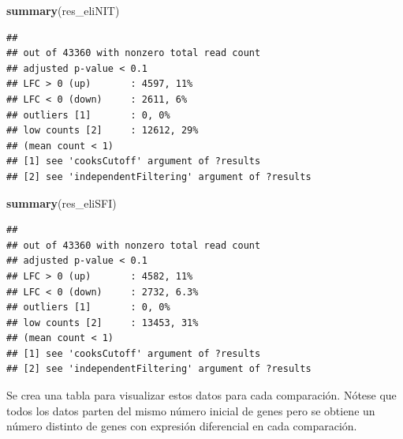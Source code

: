 \documentclass[
]{article}
\newenvironment{Shaded}{\begin{snugshade}}{\end{snugshade}}
\newcommand{\KeywordTok}[1]{\textcolor[rgb]{0.13,0.29,0.53}{\textbf{#1}}}
\newcommand{\NormalTok}[1]{#1}
\begin{document}
\begin{Shaded}
\begin{Highlighting}[]
\KeywordTok{summary}\NormalTok{(res_eliNIT)}
\end{Highlighting}
\end{Shaded}

\begin{verbatim}
## 
## out of 43360 with nonzero total read count
## adjusted p-value < 0.1
## LFC > 0 (up)       : 4597, 11%
## LFC < 0 (down)     : 2611, 6%
## outliers [1]       : 0, 0%
## low counts [2]     : 12612, 29%
## (mean count < 1)
## [1] see 'cooksCutoff' argument of ?results
## [2] see 'independentFiltering' argument of ?results
\end{verbatim}

\begin{Shaded}
\begin{Highlighting}[]
\KeywordTok{summary}\NormalTok{(res_eliSFI)}
\end{Highlighting}
\end{Shaded}

\begin{verbatim}
## 
## out of 43360 with nonzero total read count
## adjusted p-value < 0.1
## LFC > 0 (up)       : 4582, 11%
## LFC < 0 (down)     : 2732, 6.3%
## outliers [1]       : 0, 0%
## low counts [2]     : 13453, 31%
## (mean count < 1)
## [1] see 'cooksCutoff' argument of ?results
## [2] see 'independentFiltering' argument of ?results
\end{verbatim}

Se crea una tabla para visualizar estos datos para cada comparación.
Nótese que todos los datos parten del mismo número inicial de genes pero
se obtiene un número distinto de genes con expresión diferencial en cada
comparación.
\end{document}
